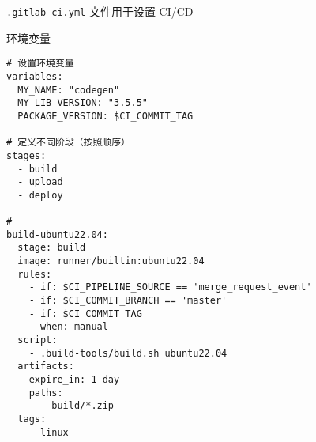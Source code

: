 
\verb`.gitlab-ci.yml` 文件用于设置 CI/CD

环境变量
\begin{lstlisting}[language=none]
# 设置环境变量
variables:
  MY_NAME: "codegen"
  MY_LIB_VERSION: "3.5.5"
  PACKAGE_VERSION: $CI_COMMIT_TAG

# 定义不同阶段（按照顺序）
stages:
  - build
  - upload
  - deploy

# 
build-ubuntu22.04:
  stage: build
  image: runner/builtin:ubuntu22.04
  rules:
    - if: $CI_PIPELINE_SOURCE == 'merge_request_event'
    - if: $CI_COMMIT_BRANCH == 'master'
    - if: $CI_COMMIT_TAG
    - when: manual
  script:
    - .build-tools/build.sh ubuntu22.04
  artifacts:
    expire_in: 1 day
    paths:
      - build/*.zip
  tags:
    - linux
\end{lstlisting}
